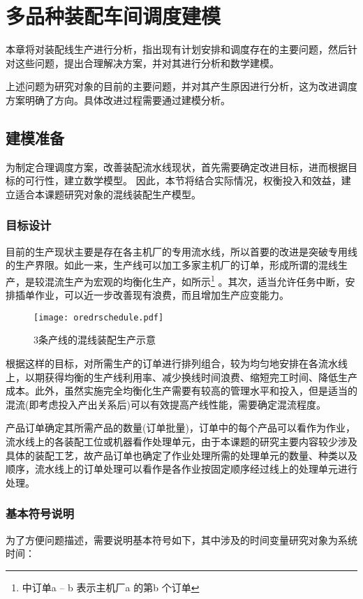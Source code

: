 \chapter{多品种装配车间调度建模}
本章将对装配线生产进行分析，指出现有计划安排和调度存在的主要问题，然后针对这些问题，提出合理解决方案，并对其进行分析和数学建模。



上述问题为研究对象的目前的主要问题，并对其产生原因进行分析，这为改进调度方案明确了方向。具体改进过程需要通过建模分析。

\section{建模准备}
为制定合理调度方案，改善装配流水线现状，首先需要确定改进目标，进而根据目标的可行性，建立数学模型。
因此，本节将结合实际情况，权衡投入和效益，建立适合本课题研究对象的混线装配生产模型。
\subsection{目标设计}
目前的生产现状主要是存在各主机厂的专用流水线，所以首要的改进是突破专用线的生产界限。如此一来，生产线可以加工多家主机厂的订单，形成所谓的混线生产，是较混流生产为宏观的均衡化生产，如所示\footnote{中订单a -- b 表示主机厂a 的第b 个订单}
。其次，适当允许任务中断，安排插单作业，可以近一步改善现有浪费，而且增加生产应变能力。
\begin{figure}[h]
\centering
\texttt{[image: oredrschedule.pdf]}
\caption{3条产线的混线装配生产示意\label{fig:orderschedule}}
\end{figure}

根据这样的目标，对所需生产的订单进行排列组合，较为均匀地安排在各流水线上，以期获得均衡的生产线利用率、减少换线时间浪费、缩短完工时间、降低生产成本。此外，虽然实施完全均衡化生产需要有较高的管理水平和投入，但是适当的混流(即考虑投入产出关系后)可以有效提高产线性能，需要确定混流程度。

产品订单确定其所需产品的数量(订单批量)，订单中的每个产品可以看作为作业，流水线上的各装配工位或机器看作处理单元，由于本课题的研究主要内容较少涉及具体的装配工艺，故产品订单也确定了作业处理所需的处理单元的数量、种类以及顺序，流水线上的订单处理可以看作是各作业按固定顺序经过线上的处理单元进行处理。

\subsection{基本符号说明}
为了方便问题描述，需要说明基本符号如下，其中涉及的时间变量研究对象为系统时间：

